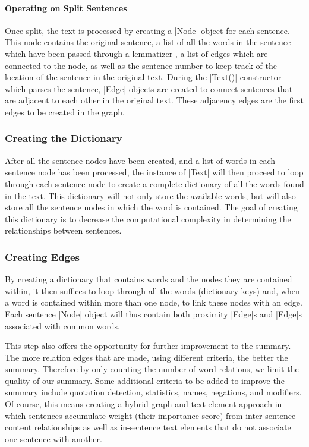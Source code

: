 	\paragraph{Operating on Split Sentences}
		Once split, the text is processed by creating a |Node| object for each sentence. This node contains the original sentence, a list of all the words in the sentence which have been passed through a lemmatizer \cite{nltk}, a list of edges which are connected to the node, as well as the sentence number to keep track of the location of the sentence in the original text. During the |Text()| constructor which parses the sentence, |Edge| objects are created to connect sentences that are adjacent to each other in the original text. These adjacency edges are the first edges to be created in the graph.
	
	\subsubsection{Creating the Dictionary}
		After all the sentence nodes have been created, and a list of words in each sentence node has been processed, the instance of |Text| will then proceed to loop through each sentence node to create a complete dictionary of all the words found in the text. This dictionary will not only store the available words, but will also store all the sentence nodes in which the word is contained. The goal of creating this dictionary is to decrease the computational complexity in determining the relationships between sentences. 
		
	\subsubsection{Creating Edges}
		By creating a dictionary that contains words and the nodes they are contained within, it then suffices to loop through all the words (\ie dictionary keys) and, when a word is contained within more than one node, to link these nodes with an edge. Each sentence |Node| object will thus contain both proximity |Edge|s and |Edge|s associated with common words.
		
		This step also offers the opportunity for further improvement to the summary. The more relation edges that are made, using different criteria, the better the summary. Therefore by only counting the number of word relations, we limit the quality of our summary. Some additional criteria to be added to improve the summary include quotation detection, statistics, names, negations, and modifiers. Of course, this means creating a hybrid graph-and-text-element approach in which sentences accumulate weight (\ie their importance score) from inter-sentence content relationships as well as in-sentence text elements that do not associate one sentence with another.
		
